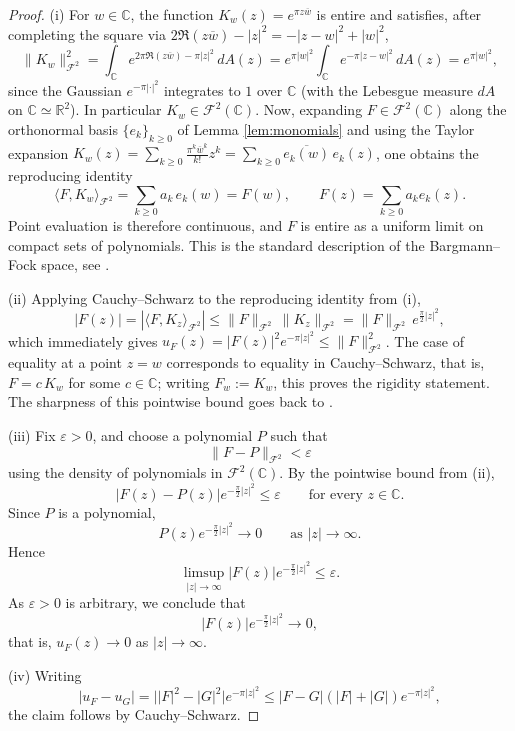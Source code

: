 \documentclass[a4paper,11pt,reqno]{amsart}
\numberwithin{equation}{section}
\theoremstyle{plain} %
\theoremstyle{definition} %
\theoremstyle{remark}
\newcommand{\C}{\mathbb{C}}
\begin{document}
\begin{proof}
(i) For \(w\in \C\), the function \(K_w(z)=e^{\pi z\overline w}\) is entire and
satisfies, after completing the square via
\(2\Re(z\overline w)-|z|^2=-|z-w|^2+|w|^2\),
\[
\|K_w\|_{\mathcal F^2}^2
=
\int_{\C} e^{2\pi \Re(z\overline w)-\pi |z|^2}\,dA(z)
=
e^{\pi |w|^2}\int_{\C}e^{-\pi |z-w|^2}\,dA(z)
=
e^{\pi |w|^2},
\]
since the Gaussian \(e^{-\pi |\cdot|^2}\) integrates to \(1\) over \(\C\) (with
the Lebesgue measure \(dA\) on \(\C\simeq \mathbb R^2\)). In particular
\(K_w\in \mathcal F^2(\C)\). Now, expanding \(F\in \mathcal F^2(\C)\) along the
orthonormal basis \(\{e_k\}_{k\geq 0}\) of Lemma \ref{lem:monomials} and using
the Taylor expansion
\(K_w(z)=\sum_{k\geq 0}\frac{\pi^k\overline w^k}{k!}z^k=\sum_{k\geq 0}\overline{e_k(w)}\,e_k(z)\),
one obtains the reproducing identity
\[
\langle F,K_w\rangle_{\mathcal F^2}
=
\sum_{k\geq 0} a_k\,e_k(w)
=
F(w),
\qquad F(z)=\sum_{k\geq 0}a_k e_k(z).
\]
Point evaluation is therefore continuous, and \(F\) is entire as a uniform
limit on compact sets of polynomials. This is the standard description of the
Bargmann--Fock space, see \cite{Bargmann,Folland,Grochenig,Zhu}.

(ii) Applying Cauchy--Schwarz to the reproducing identity from (i),
\begin{equation}\label{eq:pointwise}
|F(z)|
=
|\langle F,K_z\rangle_{\mathcal F^2}|
\le
\|F\|_{\mathcal F^2}\,\|K_z\|_{\mathcal F^2}
=
\|F\|_{\mathcal F^2}\,e^{\frac{\pi}{2}|z|^2},
\end{equation}
which immediately gives \(u_F(z)=|F(z)|^2 e^{-\pi |z|^2}\le \|F\|_{\mathcal F^2}^2\).
The case of equality at a point \(z=w\) corresponds to equality in
Cauchy--Schwarz, that is, \(F=c\,K_w\) for some \(c\in \C\); writing
\(F_w:=K_w\), this proves the rigidity statement. The sharpness of this
pointwise bound goes back to \cite{Lieb}.

(iii) Fix \(\varepsilon>0\), and choose a polynomial \(P\) such that
\[
\|F-P\|_{\mathcal F^2}<\varepsilon
\]
using the density of polynomials in \(\mathcal F^2(\C)\). By the pointwise bound from (ii),
\[
|F(z)-P(z)|e^{-\frac{\pi}{2}|z|^2}\le \varepsilon
\qquad\text{for every }z\in \C.
\]
Since \(P\) is a polynomial,
\[
P(z)e^{-\frac{\pi}{2}|z|^2}\to 0
\qquad\text{as }|z|\to\infty.
\]
Hence
\[
\limsup_{|z|\to\infty}|F(z)|e^{-\frac{\pi}{2}|z|^2}\le \varepsilon.
\]
As \(\varepsilon>0\) is arbitrary, we conclude that
\[
|F(z)|e^{-\frac{\pi}{2}|z|^2}\to 0,
\]
that is, \(u_F(z)\to 0\) as \(|z|\to\infty\).

(iv) Writing
\[
|u_F - u_G|
= \big||F|^2 - |G|^2\big| e^{-\pi|z|^2}
\le |F-G|(|F|+|G|) e^{-\pi|z|^2},
\]
the claim follows by Cauchy--Schwarz.
\end{proof}
\end{document}
